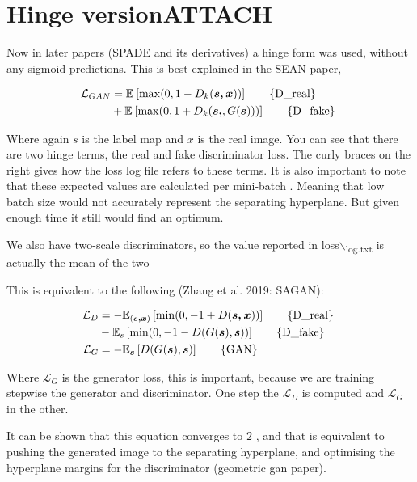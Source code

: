 \documentclass{memoir}
\begin{document}
\section{Hinge version\hfill{}\textsc{ATTACH}}
\label{sec:orga9fd9a5}
Now in later papers (SPADE and its derivatives) a hinge form was used, without
any sigmoid predictions. This is best explained in the SEAN paper,

\begin{align}
\mathcal{ L }_{GAN} &= \mathbb{E}_{} \left[ \max(0,1 - D_{k}(\boldsymbol{s,x})) \right] \tag*{\{D\_real\} }\\
 &+ \mathbb{E}_{} \left[ \max(0, 1 + D_{k}(\boldsymbol{s,},G(\boldsymbol{s}))) \right] \tag*{\{D\_fake\} }
\end{align}

Where again \(s\) is the label map and \(x\) is the real image. You can see
that there are two hinge terms, the real and fake discriminator loss. The curly
braces on the right gives how the loss log file refers to these terms. It is
also important to note that these expected values are calculated per mini-batch
\cite{limGeometricGAN2017}. Meaning that low batch size would not accurately
represent the separating hyperplane. But given enough time it still would find
an optimum.

We also have two-scale discriminators, so the value reported in loss$\backslash$\textsubscript{log.txt} is
actually the mean of the two

This is equivalent to the following (Zhang et al. 2019: SAGAN):

\begin{align}
\mathcal{ L }_{D} &= - \mathbb{E}_{(\boldsymbol{s,x})} \left[ \min(0, -1 + D(\boldsymbol{s,x})) \right] \tag*{\{D\_real\} }\\
 &- \mathbb{E}_{s} \left[ \min(0, -1 - D(G(\boldsymbol{s}) , \boldsymbol{s})) \right] \tag*{\{D\_fake\} }\\
\mathcal{ L }_{G} &= - \mathbb{E}_{\boldsymbol{s} } \left[ D(G(\boldsymbol{s}) , \boldsymbol{s}) \right] \tag*{\{GAN\} }
\end{align}

Where \(\mathcal{ L }_{G}\) is the generator loss, this is important, because
we are training stepwise the generator and discriminator. One step the
\(\mathcal{ L }_{D}\) is computed and \(\mathcal{ L }_{G}\) in the other.


It can be shown that this equation converges to \(2\) , and that is equivalent
to pushing the generated image to the separating hyperplane, and optimising the
hyperplane margins for the discriminator (geometric gan paper).
\end{document}
